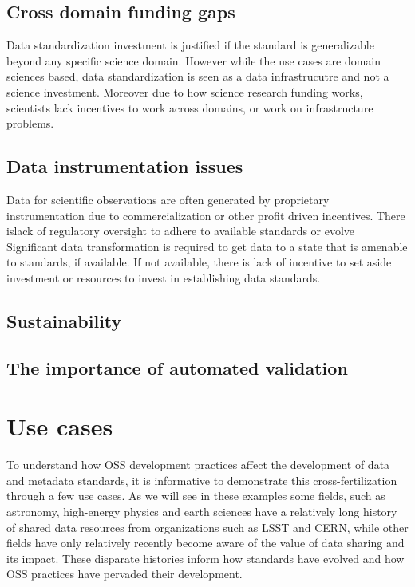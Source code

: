 \documentclass[
  letterpaper,
  DIV=11,
  numbers=noendperiod]{scrartcl}
\begin{document}
\subsection{Cross domain funding gaps}\label{cross-domain-funding-gaps}

Data standardization investment is justified if the standard is
generalizable beyond any specific science domain. However while the use
cases are domain sciences based, data standardization is seen as a data
infrastrucutre and not a science investment. Moreover due to how science
research funding works, scientists lack incentives to work across
domains, or work on infrastructure problems.

\subsection{Data instrumentation
issues}\label{data-instrumentation-issues}

Data for scientific observations are often generated by proprietary
instrumentation due to commercialization or other profit driven
incentives. There islack of regulatory oversight to adhere to available
standards or evolve Significant data transformation is required to get
data to a state that is amenable to standards, if available. If not
available, there is lack of incentive to set aside investment or
resources to invest in establishing data standards.

\subsection{Sustainability}\label{sustainability}

\subsection{The importance of automated
validation}\label{the-importance-of-automated-validation}

\section{Use cases}\label{use-cases}

To understand how OSS development practices affect the development of
data and metadata standards, it is informative to demonstrate this
cross-fertilization through a few use cases. As we will see in these
examples some fields, such as astronomy, high-energy physics and earth
sciences have a relatively long history of shared data resources from
organizations such as LSST and CERN, while other fields have only
relatively recently become aware of the value of data sharing and its
impact. These disparate histories inform how standards have evolved and
how OSS practices have pervaded their development.
\end{document}
